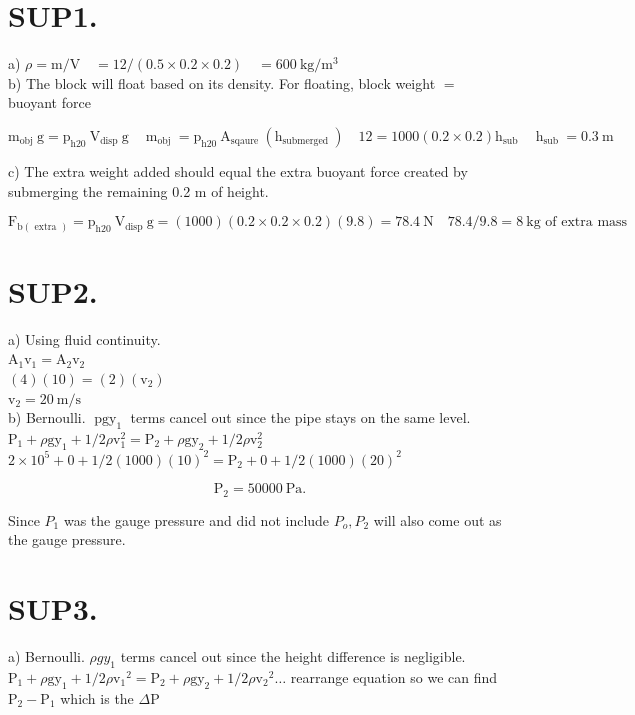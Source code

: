 \begin{enumerate}
\section*{SUP1.}
a) $\rho=\mathrm{m} / \mathrm{V} \quad=12 /(0.5 \times 0.2 \times 0.2) \quad=600 \mathrm{~kg} / \mathrm{m}^{3}$\\
b) The block will float based on its density. For floating, block weight $=$ buoyant force

$$
\mathrm{m}_{\text {obj }} \mathrm{g}=\mathrm{p}_{\mathrm{h} 20} \mathrm{~V}_{\text {disp }} \mathrm{g} \quad \mathrm{~m}_{\text {obj }}=\mathrm{p}_{\mathrm{h} 20} \mathrm{~A}_{\text {sqaure }}\left(\mathrm{h}_{\text {submerged }}\right) \quad 12=1000(0.2 \times 0.2) \mathrm{h}_{\text {sub }} \quad \mathrm{h}_{\text {sub }}=0.3 \mathrm{~m}
$$

c) The extra weight added should equal the extra buoyant force created by submerging the remaining 0.2 m of height.

$$
\mathrm{F}_{\mathrm{b}(\text { extra })}=\mathrm{p}_{\mathrm{h} 20} \mathrm{~V}_{\text {disp }} \mathrm{g}=(1000)(0.2 \times 0.2 \times 0.2)(9.8)=78.4 \mathrm{~N} \quad 78.4 / 9.8=8 \mathrm{~kg} \text { of extra mass }
$$

\section*{SUP2.}
a) Using fluid continuity.\\
$\mathrm{A}_{1} \mathrm{v}_{1}=\mathrm{A}_{2} \mathrm{v}_{2}$\\
$(4)(10)=(2)\left(\mathrm{v}_{2}\right)$\\
$\mathrm{v}_{2}=20 \mathrm{~m} / \mathrm{s}$\\
b) Bernoulli. $\operatorname{pgy}_{1}$ terms cancel out since the pipe stays on the same level.\\
$\mathrm{P}_{1}+\rho \mathrm{gy}_{1}+1 / 2 \rho \mathrm{v}_{1}^{2}=\mathrm{P}_{2}+\rho \mathrm{gy}_{2}+1 / 2 \rho \mathrm{v}_{2}^{2}$\\
$2 \times 10^{5}+0+1 / 2(1000)(10)^{2}=\mathrm{P}_{2}+0+1 / 2(1000)(20)^{2}$

$$
\mathrm{P}_{2}=50000 \mathrm{~Pa} .
$$

Since $P_{1}$ was the gauge pressure and did not include $P_{o}, P_{2}$ will also come out as the gauge pressure.

\section*{SUP3.}
a) Bernoulli. $\rho g y_{1}$ terms cancel out since the height difference is negligible.\\
$\mathrm{P}_{1}+\rho \mathrm{gy}_{1}+1 / 2 \rho \mathrm{v}_{1}{ }^{2}=\mathrm{P}_{2}+\rho \mathrm{gy}_{2}+1 / 2 \rho \mathrm{v}_{2}{ }^{2} \ldots$ rearrange equation so we can find $\mathrm{P}_{2}-\mathrm{P}_{1}$ which is the $\Delta \mathrm{P}$


\end{enumerate}
